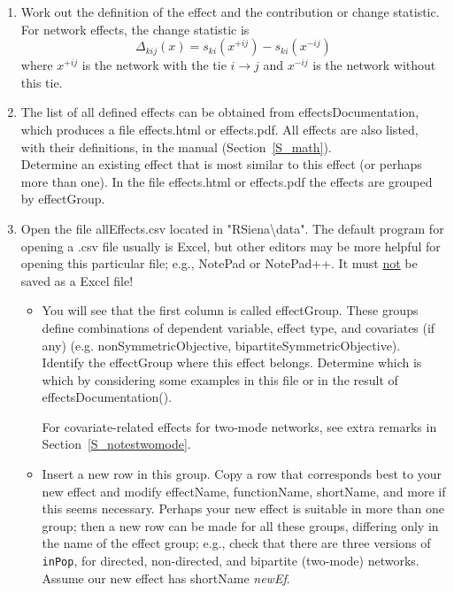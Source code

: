 \documentclass[a4paper,fleqn,11pt]{article}
\newcommand{\+}{\, + \,}
\newcommand{\sfn}[1]{\textsf{#1}}
\begin{document}
\begin{enumerate}

\item Work out the definition of the effect and the contribution or
      change statistic.
      For network effects, the change statistic is
      \begin{equation}
      \Delta_{kij} (x) =  s_{ki}(x^{+ij}) -     s_{ki}(x^{-ij})  \label{changestat}
      \end{equation}
      where $x^{+ij}$ is the network with the tie $i \rightarrow j$
      and $x^{-ij}$ is the network without this tie.
\item The list of all defined effects can be obtained from \textsf{effectsDocumentation},
      which produces a file \textsf{effects.html} or \textsf{effects.pdf}.
      All effects are also listed, with their definitions, in the manual (Section~\ref{S_math}). \\
      Determine an existing effect that is most similar
      to this effect (or perhaps more than one).
      In the file \textsf{effects.html} or \textsf{effects.pdf} the effects are grouped
      by \sfn{effectGroup}.
\item Open the file \textsf{allEffects.csv} located in
       \textsf{"RSiena\textbackslash data"}. The default program for opening a .csv file
       usually is Excel, but other editors may be more helpful
       for opening this particular file; e.g., NotePad or NotePad++.
       It must \underline{not} be saved as a Excel file!
	   \begin{itemize}
		\item You will see that the first column is called \sfn{effectGroup}.
              These groups define combinations of dependent variable, effect type,
              and covariates (if any)
              (e.g. nonSymmetricObjective,  bipartiteSymmetricObjective).
              Identify the effectGroup where this effect belongs.
              Determine which is which by considering some examples
              in this file or in the result of \sfn{effectsDocumentation()}.

              For covariate-related effects for two-mode networks, see
              extra remarks in Section~\ref{S_notestwomode}.
    	\item Insert a new row in this group.
              Copy a row that corresponds best to your new effect
              and modify effectName, functionName, shortName,
              and more if this seems necessary.
              Perhaps your new effect is suitable in more than one group;
              then a new row can be made for all these groups, differing only
              in the name of the effect group; e.g., check that there are
              three versions of \texttt{inPop}, for directed, non-directed,
              and bipartite (two-mode) networks.
              Assume our new effect has shortName \textit{newEf}.


\end{itemize}
\end{enumerate}
\end{document}
